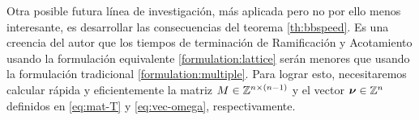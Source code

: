 Otra posible futura línea de investigación, más aplicada pero no por ello menos interesante, es
desarrollar las consecuencias del teorema \ref{th:bbspeed}. Es una creencia del autor que los
tiempos de terminación de Ramificación y Acotamiento usando la formulación equivalente
\eqref{formulation:lattice} serán menores que usando la formulación tradicional
\eqref{formulation:multiple}. Para lograr esto, necesitaremos calcular rápida y eficientemente la
matriz $M \in \mathbb{Z}^{n \times (n - 1)}$ y el vector $\boldsymbol{\nu} \in \mathbb{Z}^n$ definidos en \eqref{eq:mat-T}
y \eqref{eq:vec-omega}, respectivamente.
